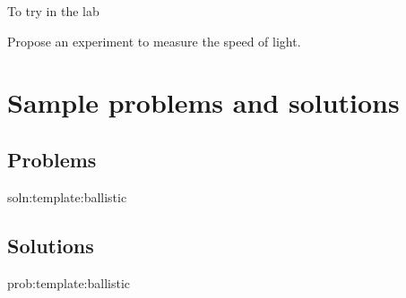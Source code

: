\begin{chapteractivity}{To try in the lab}
	{
		\item Propose an experiment to measure the speed of light.
	}
\end{chapteractivity}

\newpage
\section{Sample problems and solutions}
\subsection{Problems}

\begin{problem}{soln:template:ballistic}{\label{prob:template:ballistic} 

}
\end{problem}

\newpage
\subsection{Solutions}
\begin{solution}{prob:template:ballistic}\label{soln:template:ballistic}

\end{solution}
